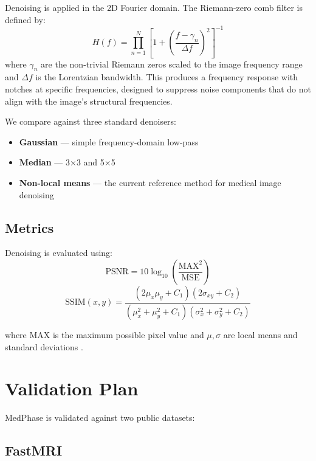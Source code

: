 \documentclass[11pt,a4paper]{article}
\begin{document}
Denoising is applied in the 2D Fourier domain. The Riemann-zero comb filter is defined by:
\begin{equation}
H(f) = \prod_{n=1}^{N} \left[ 1 + \left( \frac{f - \gamma_n}{\Delta f} \right)^2 \right]^{-1}
\end{equation}
where $\gamma_n$ are the non-trivial Riemann zeros scaled to the image frequency range and $\Delta f$ is the Lorentzian bandwidth. This produces a frequency response with notches at specific frequencies, designed to suppress noise components that do not align with the image's structural frequencies.

We compare against three standard denoisers:
\begin{itemize}
\item \textbf{Gaussian} — simple frequency-domain low-pass
\item \textbf{Median} — 3$\times$3 and 5$\times$5
\item \textbf{Non-local means} — the current reference method for medical image denoising \cite{buades2005}
\end{itemize}

\subsection{Metrics}

Denoising is evaluated using:
\begin{equation}
\mathrm{PSNR} = 10 \log_{10} \left( \frac{\mathrm{MAX}^2}{\mathrm{MSE}} \right)
\end{equation}
\begin{equation}
\mathrm{SSIM}(x, y) = \frac{(2\mu_x \mu_y + C_1)(2\sigma_{xy} + C_2)}{(\mu_x^2 + \mu_y^2 + C_1)(\sigma_x^2 + \sigma_y^2 + C_2)}
\end{equation}

where MAX is the maximum possible pixel value and $\mu, \sigma$ are local means and standard deviations \cite{wang2004}.

\section{Validation Plan}

MedPhase is validated against two public datasets:

\subsection{FastMRI}
\end{document}
